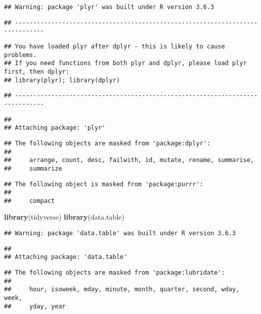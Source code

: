 \documentclass[]{article}
\newenvironment{Shaded}{\begin{snugshade}}{\end{snugshade}}
\newcommand{\KeywordTok}[1]{\textcolor[rgb]{0.13,0.29,0.53}{\textbf{#1}}}
\newcommand{\NormalTok}[1]{#1}
\begin{document}
\begin{verbatim}
## Warning: package 'plyr' was built under R version 3.6.3
\end{verbatim}

\begin{verbatim}
## ------------------------------------------------------------------------------
\end{verbatim}

\begin{verbatim}
## You have loaded plyr after dplyr - this is likely to cause problems.
## If you need functions from both plyr and dplyr, please load plyr first, then dplyr:
## library(plyr); library(dplyr)
\end{verbatim}

\begin{verbatim}
## ------------------------------------------------------------------------------
\end{verbatim}

\begin{verbatim}
## 
## Attaching package: 'plyr'
\end{verbatim}

\begin{verbatim}
## The following objects are masked from 'package:dplyr':
## 
##     arrange, count, desc, failwith, id, mutate, rename, summarise,
##     summarize
\end{verbatim}

\begin{verbatim}
## The following object is masked from 'package:purrr':
## 
##     compact
\end{verbatim}

\begin{Shaded}
\begin{Highlighting}[]
\KeywordTok{library}\NormalTok{(tidyverse)}
\KeywordTok{library}\NormalTok{(data.table)}
\end{Highlighting}
\end{Shaded}

\begin{verbatim}
## Warning: package 'data.table' was built under R version 3.6.3
\end{verbatim}

\begin{verbatim}
## 
## Attaching package: 'data.table'
\end{verbatim}

\begin{verbatim}
## The following objects are masked from 'package:lubridate':
## 
##     hour, isoweek, mday, minute, month, quarter, second, wday, week,
##     yday, year
\end{verbatim}
\end{document}
